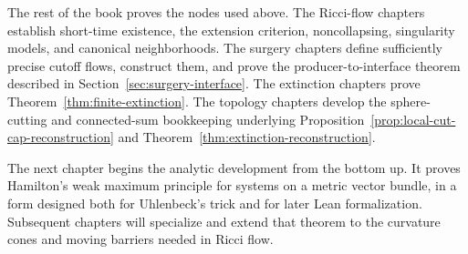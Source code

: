 \documentclass[10pt]{coll-l}
\theoremstyle{definition}
\theoremstyle{remark}
\numberwithin{section}{chapter}
\numberwithin{equation}{chapter}
\begin{document}
The rest of the book proves the nodes used above.  The Ricci-flow chapters
establish short-time existence, the extension criterion, noncollapsing,
singularity models, and canonical neighborhoods.  The surgery chapters
define sufficiently precise cutoff flows, construct them, and prove the
producer-to-interface theorem described in
Section~\ref{sec:surgery-interface}.  The extinction chapters prove
Theorem~\ref{thm:finite-extinction}.  The topology chapters develop the
sphere-cutting and connected-sum bookkeeping underlying
Proposition~\ref{prop:local-cut-cap-reconstruction} and
Theorem~\ref{thm:extinction-reconstruction}.

The next chapter begins the analytic development from the bottom up.  It
proves Hamilton's weak maximum principle for systems on a metric vector
bundle, in a form designed both for Uhlenbeck's trick and for later Lean
formalization.  Subsequent chapters will specialize and extend that theorem
to the curvature cones and moving barriers needed in Ricci flow.
\end{document}

